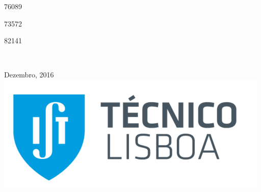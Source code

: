 \begin{titlepage}
\begin{minipage}{0.4\textwidth}
\begin{flushright}
76089

73572

82141

\end{flushright}
\end{minipage}\\[1cm]


\vspace*{4.5cm}

{\large Dezembro, 2016}\\[1cm] %

\includegraphics[scale=0.3]{img/logo.png}\\[1cm]

\end{titlepage}
